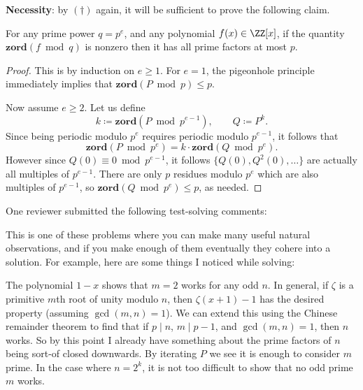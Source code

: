 \documentclass[11pt]{scrartcl}
\begin{document}
\textbf{Necessity}: by $(\dagger)$ again,
it will be sufficient to prove the following claim.
\begin{claim*}
  For any prime power $q = p^e$, and any polynomial $f(x) \in \ZZ[x]$,
  if the quantity $\mathbf{zord}(f \bmod q)$ is nonzero
  then it has all prime factors at most $p$.
\end{claim*}
\begin{proof}
  This is by induction on $e \ge 1$.
  For $e=1$, the pigeonhole principle immediately
  implies that $\mathbf{zord}(P \bmod p) \le p$.

  Now assume $e \ge 2$.
  Let us define
  \[ k \coloneqq \mathbf{zord}(P \bmod{p^{e-1}}),
    \qquad Q \coloneqq P^k. \]
  Since being periodic modulo $p^e$ requires periodic modulo $p^{e-1}$,
  it follows that
  \[ \mathbf{zord}(P \bmod{p^e}) = k \cdot \mathbf{zord}(Q \bmod{p^e}). \]
  However since $Q(0) \equiv 0\bmod p^{e-1}$, it follows $\{Q(0), Q^2(0), \dots\}$
  are actually all multiples of $p^{e-1}$.
  There are only $p$ residues modulo $p^e$ which are also multiples of $p^{e-1}$,
  so $\mathbf{zord}(Q \bmod{p^e}) \le p$, as needed.
\end{proof}

\begin{remark*}
  One reviewer submitted the following test-solving comments:

  This is one of these problems where you can make many useful natural observations,
  and if you make enough of them eventually they cohere into a solution.
  For example, here are some things I noticed while solving:
  \begin{itemize}
  \ii The polynomial $1-x$ shows that $m=2$ works for any odd $n$.
  \ii In general, if $\zeta$ is a primitive $m$th root of unity
  modulo $n$, then $\zeta(x+1)-1$ has the desired property (assuming $\gcd(m,n) = 1$).
  We can extend this using the Chinese remainder theorem
  to find that if $p \mid n$, $m \mid p-1$, and $\gcd(m,n)=1$, then $n$ works.
  So by this point I already have something
  about the prime factors of $n$ being sort-of closed downwards.
  \ii By iterating $P$ we see it is enough to consider $m$ prime.
  \ii In the case where $n=2^k$,
  it is not too difficult to show that no odd prime $m$ works.
  \end{itemize}
\end{remark*}
\pagebreak
\end{document}
